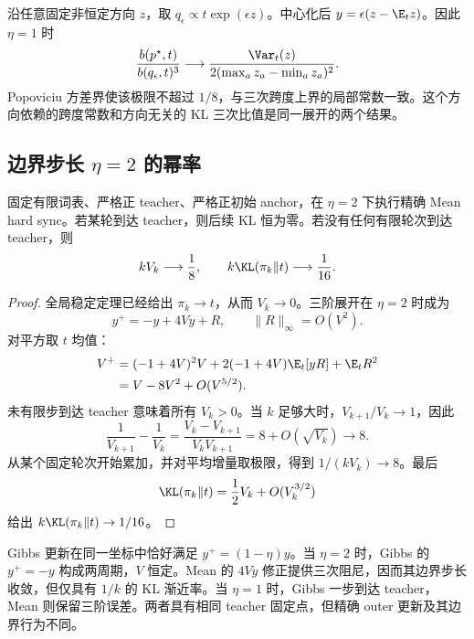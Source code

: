 沿任意固定非恒定方向 $z$，取 $q_\epsilon\propto t\exp(\epsilon z)$。中心化后 $y=\epsilon(z-\E_tz)$。因此 $\eta=1$ 时
\[
 \frac{b(p^\star,t)}{b(q_\epsilon,t)^3}
 \longrightarrow
 \frac{\Var_t(z)}{2(\max_a z_a-\min_a z_a)^2}.
\]
Popoviciu 方差界使该极限不超过 $1/8$，与三次跨度上界的局部常数一致。这个方向依赖的跨度常数和方向无关的 KL 三次比值是同一展开的两个结果。

\subsection{边界步长 $\eta=2$ 的幂率}
\label{sec:mean-hard-sync-boundary-rate}

\begin{theorem}
\label{thm:mean-hard-sync-boundary-rate}
固定有限词表、严格正 teacher、严格正初始 anchor，在 $\eta=2$ 下执行精确 Mean hard sync。若某轮到达 teacher，则后续 KL 恒为零。若没有任何有限轮次到达 teacher，则
\begin{equation}
 kV_k\longrightarrow\frac18,
 \qquad k\KL(\pi_k\Vert t)\longrightarrow\frac1{16}.
 \label{eq:mean-hard-sync-boundary-rate}
\end{equation}
\end{theorem}

\begin{proof}
全局稳定定理已经给出 $\pi_k\to t$，从而 $V_k\to0$。三阶展开在 $\eta=2$ 时成为
\[
 y^+=-y+4Vy+R,\qquad \|R\|_\infty=O(V^2).
\]
对平方取 $t$ 均值：
\begin{align*}
 V^+
 &=(-1+4V)^2V+2(-1+4V)\E_t[yR]+\E_tR^2\\
 &=V-8V^2+O(V^{5/2}).
\end{align*}
未有限步到达 teacher 意味着所有 $V_k>0$。当 $k$ 足够大时，$V_{k+1}/V_k\to1$，因此
\[
 \frac1{V_{k+1}}-\frac1{V_k}
 =\frac{V_k-V_{k+1}}{V_kV_{k+1}}
 =8+O(\sqrt{V_k})\longrightarrow8.
\]
从某个固定轮次开始累加，并对平均增量取极限，得到 $1/(kV_k)\to8$。最后
\[
 \KL(\pi_k\Vert t)=\frac12V_k+O(V_k^{3/2})
\]
给出 $k\KL(\pi_k\Vert t)\to1/16$。
\end{proof}

Gibbs 更新在同一坐标中恰好满足 $y^+=(1-\eta)y$。当 $\eta=2$ 时，Gibbs 的 $y^+=-y$ 构成两周期，$V$ 恒定。Mean 的 $4Vy$ 修正提供三次阻尼，因而其边界步长收敛，但仅具有 $1/k$ 的 KL 渐近率。当 $\eta=1$ 时，Gibbs 一步到达 teacher，Mean 则保留三阶误差。两者具有相同 teacher 固定点，但精确 outer 更新及其边界行为不同。
